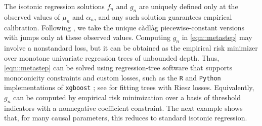 \documentclass[11pt]{article}
\theoremstyle{plain}
\begin{document}





{\color{purple} The isotonic regression solutions \(f_n\) and \(g_n\) are uniquely defined only at the observed values of \(\mu_n\) and \(\alpha_n\), and any such solution guarantees empirical calibration. Following \citet{groeneboom1993isotonic}, we take the unique c\`adl\`ag piecewise-constant versions with jumps only at these observed values.} Computing \(g_n\) in \eqref{eqn::metastep} may involve a nonstandard loss, but it can be obtained as the empirical risk minimizer over monotone univariate regression trees of unbounded depth. Thus, \eqref{eqn::metastep} can be solved using regression-tree software that supports monotonicity constraints and custom losses, such as the \texttt{R} and \texttt{Python} implementations of \texttt{xgboost} \citep{chen2016xgboost}; see \citet{lee2025rieszboost} for fitting trees with Riesz losses. Equivalently, \(g_n\) can be computed by empirical risk minimization over a basis of threshold indicators with a nonnegative coefficient constraint. The next example shows that, for many causal parameters, this reduces to standard isotonic regression.

 

\setcounter{example}{0}
\end{document}

